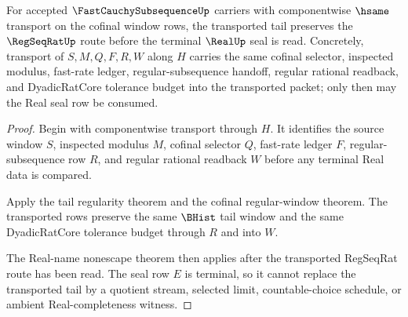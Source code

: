 \begin{theorem}
\label{thm:fast-cauchy-subsequence-regseqrat-tail-transport}
For accepted $\FastCauchySubsequenceUp$ carriers with componentwise $\hsame$ transport on the cofinal window rows, the transported tail preserves the $\RegSeqRatUp$ route before the terminal $\RealUp$ seal is read. Concretely, transport of $S,M,Q,F,R,W$ along $H$ carries the same cofinal selector, inspected modulus, fast-rate ledger, regular-subsequence handoff, regular rational readback, and DyadicRatCore tolerance budget into the transported packet; only then may the Real seal row be consumed.
\end{theorem}
\begin{proof}
Begin with componentwise transport through $H$. It identifies the source window $S$, inspected modulus $M$, cofinal selector $Q$, fast-rate ledger $F$, regular-subsequence row $R$, and regular rational readback $W$ before any terminal Real data is compared.

Apply the tail regularity theorem and the cofinal regular-window theorem. The transported rows preserve the same $\BHist$ tail window and the same DyadicRatCore tolerance budget through $R$ and into $W$.

The Real-name nonescape theorem then applies after the transported RegSeqRat route has been read. The seal row $E$ is terminal, so it cannot replace the transported tail by a quotient stream, selected limit, countable-choice schedule, or ambient Real-completeness witness.
\end{proof}
